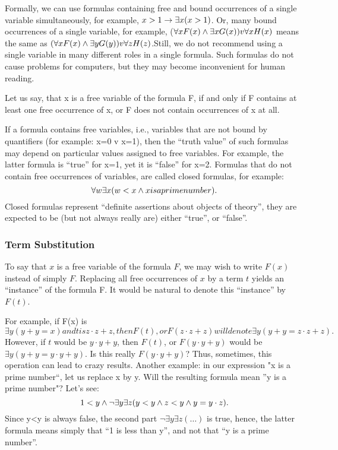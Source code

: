Formally, we can use formulas containing free and bound occurrences of a single variable simultaneously, for example, \(x>1\rightarrow \exists x(x>1)\). Or, many bound occurrences of a single variable, for example, (\(\forall xF(x) \wedge \exists xG(x)) v \forall xH(x)\) means the same as \((\forall xF(x) \wedge  \exists yG(y)) v \forall zH(z) \).Still, we do not recommend using a single variable in many different roles in a single formula. Such formulas do not cause problems for computers, but they may become inconvenient for human reading.

Let us say, that x is a free variable of the formula F, if and only if F contains at least one free occurrence of x, or F does not contain occurrences of x at all.

If a formula contains free variables, i.e., variables that are not bound by quantifiers (for example: x=0 v x=1), then the ``truth value'' of such formulas may depend on particular values assigned to free variables.  For example, the latter formula is ``true'' for x=1, yet it is ``false'' for x=2. Formulas that do not contain free occurrences of variables, are called closed formulas, for example:
\[
\forall w\exists x( w<x \wedge  x is a prime number).
\]
Closed formulas represent ``definite assertions about objects of theory'', they are expected to be (but not always really are) either ``true'', or ``false''.

\subsubsection{Term Substitution}

To say that \(x\) is a free variable of the formula \(F\), we may wish to write \(F(x)\) instead of simply \(F\). Replacing all free occurrences of \(x\) by a term \(t\) yields an ``instance'' of the formula F.
It would be natural to denote this ``instance'' by \(F(t)\).

For example, if F(x) is \(\exists y(y+y=x) and t is z\cdot z+z, then F(t), or F(z\cdot z+z) will denote \exists y(y+y=z\cdot z+z).\) However, if \(t\) would be \(y\cdot y+y\), then \(F(t)\), or \(F(y\cdot y+y)\) would be \(\exists y(y+y=y\cdot y+y)\).  Is this really \(F(y\cdot y+y)\)?  Thus, sometimes, this operation can lead to crazy results. Another example: in our expression "x is a prime number``, let us replace x by y. Will the resulting formula mean ''y is a prime number"? Let's see: \[1<y \wedge  \neg \exists y\exists z(y<y \wedge  z<y \wedge  y=y\cdot z).\] Since y<y is always false, the second part \(\neg \exists y\exists z(\ldots )\) is true, hence, the latter formula means simply that ``1 is less than y'', and not that ``y is a prime number''.

